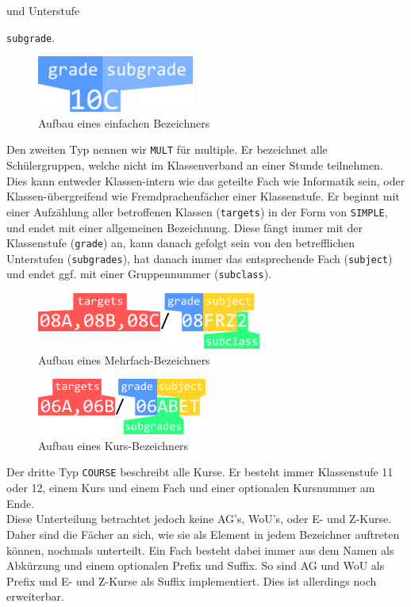 und Unterstufe {\texttt{subgrade}.\\
\begin{figure}[H]
	\centering
	\includegraphics[height=5em]{svg/simple.png}
	\caption{Aufbau eines einfachen Bezeichners}
\end{figure}

Den zweiten Typ nennen wir \glqq\texttt{MULT}\grqq{} für \glqq multiple\grqq{}. Er bezeichnet alle Schülergruppen,
welche nicht im Klassenverband an einer Stunde teilnehmen. Dies kann entweder Klassen-intern wie das geteilte Fach
wie Informatik sein, oder Klassen-übergreifend wie Fremdprachenfächer einer Klassenstufe. Er beginnt mit einer
Aufzählung aller betroffenen Klassen (\texttt{targets}) in der Form von \texttt{SIMPLE}, und endet mit einer
allgemeinen Bezeichnung. Diese fängt immer mit der Klassenstufe (\texttt{grade}) an, kann danach gefolgt sein von
den betrefflichen Unterstufen (\texttt{subgrades}), hat danach immer das entsprechende Fach (\texttt{subject}) und
endet ggf. mit einer Gruppennummer (\texttt{subclass}). \\
\begin{figure}[H]
	\centering
	\includegraphics[height=5em]{svg/mult1.png}
	\caption{Aufbau eines Mehrfach-Bezeichners}
\end{figure}
\vspace{2em}
\begin{figure}[H]
	\centering
	\includegraphics[height=5em]{svg/mult2.png}
	\caption{Aufbau eines Kurs-Bezeichners}
\end{figure}

Der dritte Typ \glqq\texttt{COURSE}\grqq{} beschreibt alle Kurse. Er besteht immer Klassenstufe 11 oder 12, einem
Kurs und einem Fach und einer optionalen Kursnummer am Ende.\\
Diese Unterteilung betrachtet jedoch keine AG's, WoU's, oder E- und Z-Kurse. Daher sind die Fächer an sich, wie sie
als Element in jedem Bezeichner auftreten können, nochmals unterteilt. Ein Fach besteht dabei immer aus dem Namen
als Abkürzung und einem optionalen Prefix und Suffix. So sind AG und WoU als Prefix und E- und Z-Kurse als Suffix
implementiert. Dies ist allerdings noch erweiterbar.

}
